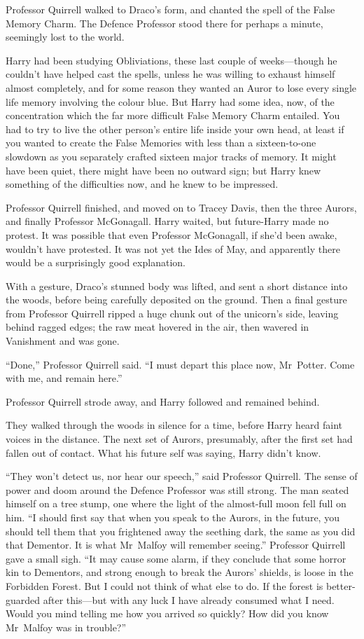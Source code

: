 Professor Quirrell walked to Draco’s form, and chanted the spell of the False Memory Charm. The Defence Professor stood there for perhaps a minute, seemingly lost to the world.

Harry had been studying Obliviations, these last couple of weeks—though he couldn’t have helped cast the spells, unless he was willing to exhaust himself almost completely, and for some reason they wanted an Auror to lose every single life memory involving the colour blue. But Harry had some idea, now, of the concentration which the far more difficult False Memory Charm entailed. You had to try to live the other person’s entire life inside your own head, at least if you wanted to create the False Memories with less than a sixteen-to-one slowdown as you separately crafted sixteen major tracks of memory. It might have been quiet, there might have been no outward sign; but Harry knew something of the difficulties now, and he knew to be impressed.

Professor Quirrell finished, and moved on to Tracey Davis, then the three Aurors, and finally Professor McGonagall. Harry waited, but future-Harry made no protest. It was possible that even Professor McGonagall, if she’d been awake, wouldn’t have protested. It was not yet the Ides of May, and apparently there would be a surprisingly good explanation.

With a gesture, Draco’s stunned body was lifted, and sent a short distance into the woods, before being carefully deposited on the ground. Then a final gesture from Professor Quirrell ripped a huge chunk out of the unicorn’s side, leaving behind ragged edges; the raw meat hovered in the air, then wavered in Vanishment and was gone.

“Done,” Professor Quirrell said. “I must depart this place now, Mr~Potter. Come with me, and remain here.”

Professor Quirrell strode away, and Harry followed and remained behind.

They walked through the woods in silence for a time, before Harry heard faint voices in the distance. The next set of Aurors, presumably, after the first set had fallen out of contact. What his future self was saying, Harry didn’t know.

“They won’t detect us, nor hear our speech,” said Professor Quirrell. The sense of power and doom around the Defence Professor was still strong. The man seated himself on a tree stump, one where the light of the almost-full moon fell full on him. “I should first say that when you speak to the Aurors, in the future, you should tell them that you frightened away the seething dark, the same as you did that Dementor. It is what Mr~Malfoy will remember seeing.” Professor Quirrell gave a small sigh. “It may cause some alarm, if they conclude that some horror kin to Dementors, and strong enough to break the Aurors’ shields, is loose in the Forbidden Forest. But I could not think of what else to do. If the forest is better-guarded after this—but with any luck I have already consumed what I need. Would you mind telling me how you arrived so quickly? How did you know Mr~Malfoy was in trouble?”


